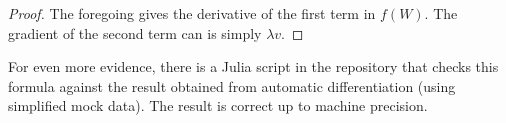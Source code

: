\documentclass{article}
\begin{document}
\begin{proof}
The foregoing gives the derivative of the first term in $f(W)$. The gradient of the second term can is simply $\lambda v$.

\end{proof}
For even more evidence, there is a Julia script in the repository that checks this formula against the result obtained from automatic differentiation (using simplified mock data). The result is correct up to machine precision.


\printbibliography
\end{document}
